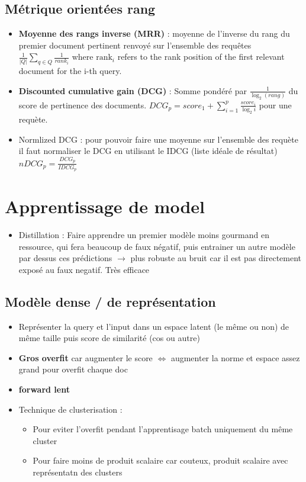 \documentclass{article}
\begin{document}
\begin{multicols}{2}
\begin{itemize}
\end{itemize}

\subsection{Métrique orientées rang}
\begin{itemize}
    \item \textbf{Moyenne des rangs inverse (MRR)} : moyenne de l'inverse du rang du premier document pertinent renvoyé sur l'ensemble des requêtes $ \frac{1}{\left| Q \right| } \sum_{q \in Q}^{} \frac{1}{rank_i} $ where $ \text{rank}_{i}$ refers to the rank position of the first relevant document for the i-th query.
    
    \item \textbf{Discounted cumulative gain (DCG)} :  Somme pondéré par $ \frac{1}{\log_{2} (rang)} $ du score de pertinence des documents. $ DCG_p = score_1 + \sum_{i=1}^{p} \frac{score_i}{\log_{2} i} $ pour une requète. 
    \item Normlized DCG : pour pouvoir faire une moyenne sur l'ensemble des requète il faut normaliser le DCG en utilisant le IDCG (liste idéale de résultat) $ nDCG_p = \frac{DCG_p}{IDCG_p} $ 
\end{itemize}

\section{Apprentissage de model}
\begin{itemize}
    \item Distillation : Faire apprendre un premier modèle moins gourmand en ressource, qui fera beaucoup de faux négatif, puis entrainer un autre modèle par dessus ces prédictions $\rightarrow$ plus robuste au bruit car il est pas directement exposé au faux negatif. Très efficace
\end{itemize}
\subsection{Modèle dense / de représentation}
\begin{itemize}
    \item Représenter la query et l'input dans un espace latent (le même ou non) de même taille puis score de similarité (cos ou autre)
    \item \textbf{Gros overfit} car augmenter le score $ \Leftrightarrow $ augmenter la norme et espace assez grand pour overfit chaque doc
    \item \textbf{forward lent}
    \item Technique de clusterisation : \begin{itemize}
        \item Pour eviter l'overfit pendant l'apprentisage batch uniquement du même cluster
        \item Pour faire moins de produit scalaire car couteux, produit scalaire avec représentatn des clusters
    \end{itemize}
\end{itemize}


\end{multicols}
\end{document}
